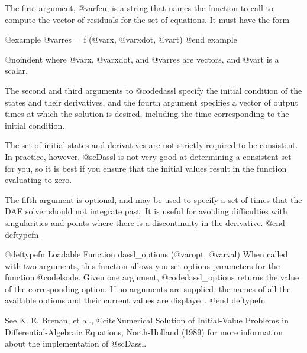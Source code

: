 The first argument, @var{fcn}, is a string that names the function to
call to compute the vector of residuals for the set of equations.
It must have the form

@example
@var{res} = f (@var{x}, @var{xdot}, @var{t})
@end example

@noindent
where @var{x}, @var{xdot}, and @var{res} are vectors, and @var{t} is a
scalar.

The second and third arguments to @code{dassl} specify the initial
condition of the states and their derivatives, and the fourth argument
specifies a vector of output times at which the solution is desired, 
including the time corresponding to the initial condition.

The set of initial states and derivatives are not strictly required to
be consistent.  In practice, however, @sc{Dassl} is not very good at
determining a consistent set for you, so it is best if you ensure that
the initial values result in the function evaluating to zero.

The fifth argument is optional, and may be used to specify a set of
times that the DAE solver should not integrate past.  It is useful for
avoiding difficulties with singularities and points where there is a
discontinuity in the derivative.
@end deftypefn

@deftypefn {Loadable Function} {} dassl_options (@var{opt}, @var{val})
When called with two arguments, this function allows you set options
parameters for the function @code{lsode}.  Given one argument,
@code{dassl_options} returns the value of the corresponding option.  If
no arguments are supplied, the names of all the available options and
their current values are displayed.
@end deftypefn

See K. E. Brenan, et al., @cite{Numerical Solution of Initial-Value
Problems in Differential-Algebraic Equations}, North-Holland (1989) for
more information about the implementation of @sc{Dassl}.
